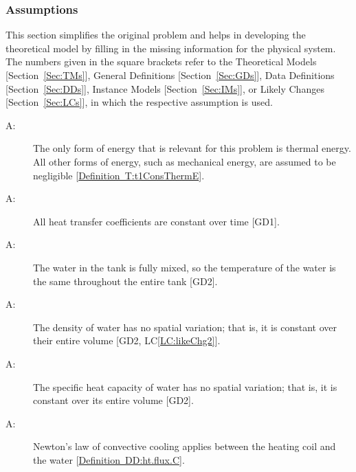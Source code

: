 \documentclass[12pt]{article}
\newcounter{assumpnum}
\newcommand{\atheassumpnum}{A\theassumpnum}
\begin{document}
\subsubsection{Assumptions}
\label{Sec:Assumps}
This section simplifies the original problem and helps in developing the theoretical model by filling in the missing information for the physical system. The numbers given in the square brackets refer to the Theoretical Models {[}Section~\ref{Sec:TMs}{]}, General Definitions {[}Section~\ref{Sec:GDs}{]}, Data Definitions {[}Section~\ref{Sec:DDs}{]}, Instance Models {[}Section~\ref{Sec:IMs}{]}, or Likely Changes {[}Section~\ref{Sec:LCs}{]}, in which the respective assumption is used.
\begin{description}
\item[\atheassumpnum\label{A:assump1}:]The only form of energy that is relevant for this problem is thermal energy. All other forms of energy, such as mechanical energy, are assumed to be negligible {[}\hyperref[T:t1ConsThermE]{Definition~T:t1ConsThermE}{]}.
\end{description}
\begin{description}
\item[\atheassumpnum\label{A:assump2}:]All heat transfer coefficients are constant over time {[}GD1{]}.
\end{description}
\begin{description}
\item[\atheassumpnum\label{A:assump3}:]The water in the tank is fully mixed, so the temperature of the water is the same throughout the entire tank {[}GD2{]}.
\end{description}
\begin{description}
\item[\atheassumpnum\label{A:assump4}:]The density of water has no spatial variation; that is, it is constant over their entire volume {[}GD2, LC\ref{LC:likeChg2}{]}.
\end{description}
\begin{description}
\item[\atheassumpnum\label{A:assump5}:]The specific heat capacity of water has no spatial variation; that is, it is constant over its entire volume {[}GD2{]}.
\end{description}
\begin{description}
\item[\atheassumpnum\label{A:assump7}:]Newton's law of convective cooling applies between the heating coil and the water {[}\hyperref[DD:ht.flux.C]{Definition~DD:ht.flux.C}{]}.
\end{description}
\end{document}
